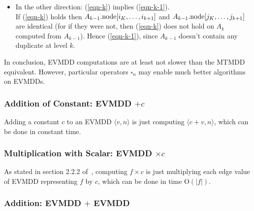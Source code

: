 \documentclass[nocover]             %
{NASA}                       %
\renewcommand{\O}[1]{\mathrm{O}\left(#1\right)}
\newcommand{\edge}[2]{\langle #1, #2 \rangle}
\newcommand{\node}[1]{#1{\rm .node}}
\begin{document}
{\begin{itemize}
\item In the other direction: (\ref{eqn-k}) implies (\ref{eqn-k-1}). \\
If (\ref{eqn-k}) holds then $\node{A_{k-1}}[i_K, \ldots, i_{k+1}]$ and
$\node{A_{k-1}}[j_K,\ldots, j_{k+1}]$ are identical (for if they were not, then (\ref{eqn-k})
does not hold on $A_k$ computed from $A_{k-1}$). Hence (\ref{eqn-k-1}), since
$A_{k-1}$ doesn't contain any duplicate at level $k$.

\end{itemize}
}%

In conclusion, EVMDD computations are at least not slower than the MTMDD equivalent.
However, particular operators $\square_n$ may enable much better algorithms on EVMDDs.

\subsubsection{Addition of Constant: EVMDD $+ c$}

Adding a constant $c$ to an EVMDD $\edge{v}{n}$
is just computing $\edge{c+v}{n}$, which can be done
in constant time.

\subsubsection{Multiplication with Scalar: EVMDD $\times c$}

As stated in section 2.2.2 of~\cite{Lai1996}, computing
$f \times c$ is just multiplying each edge value
of EVMDD representing $f$ by $c$, which can be done in
time $\O{|f|}$.

\subsubsection{Addition: EVMDD $+$ EVMDD}
\end{document}
